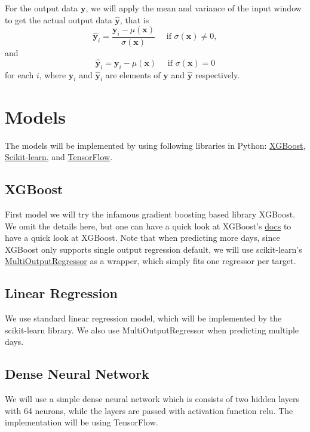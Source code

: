 \documentclass[a4paper,12pt]{article}
\begin{document}
For the output data \(\mathbf{y}\), we will apply the mean and variance of the input window to get the actual output data \(\hat{\mathbf{y}}\), that is 
\[\hat{\mathbf{y}}_i = \frac{\mathbf{y}_i - \mu(\mathbf{x})}{\sigma(\mathbf{x})} \quad \text{ if } \sigma(\mathbf{x})\neq 0, \]
and 
\[\hat{\mathbf{y}}_i = \mathbf{y}_i - \mu(\mathbf{x}) \quad \text{ if } \sigma(\mathbf{x})= 0\]
for each \(i\), where \(\mathbf{y}_i\) and \(\hat{\mathbf{y}}_i\) are elements of \(\mathbf{y}\) and \(\hat{\mathbf{y}}\) respectively.
\section{Models}
The models will be implemented by using following libraries in Python: \href{https://xgboost.readthedocs.io/en/latest/python/python_intro.html}{XGBoost}, \href{https://scikit-learn.org/}{Scikit-learn}, and \href{https://www.tensorflow.org}{TensorFlow}.
\subsection{XGBoost}
First model we will try the infamous gradient boosting based library XGBoost. We omit the details here, but one can have a quick look at XGBoost's \href{https://xgboost.readthedocs.io/en/latest/tutorials/model.html}{docs} to have a quick look at XGBoost. Note that when predicting more days, since XGBoost only supports single output regression default, we will use scikit-learn's \href{https://scikit-learn.org/stable/modules/generated/sklearn.multioutput.MultiOutputRegressor.html}{MultiOutputRegressor} as a wrapper, which simply fits one regressor per target. 
\subsection{Linear Regression}
We use standard linear regression model, which will be implemented by the scikit-learn library. We also use MultiOutputRegressor when predicting multiple days. 
\subsection{Dense Neural Network}
We will use a simple dense neural network which is consists of two hidden layers with 64 neurons, while the layers are passed with activation function relu. The implementation will be using TensorFlow.
\end{document}
